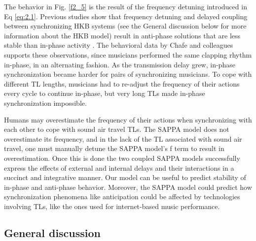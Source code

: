 \documentclass{report}
\begin{document}
The behavior in Fig.{} \ref{f2_5} is the result of the frequency detuning introduced in Eq \eqref{eq:2.1}. Previous studies show that frequency detuning and delayed coupling between synchronizing HKB systems (see the General discussion below for more information about the HKB model) result in anti-phase solutions that are less stable than in-phase activity \cite{slowinski2016effects, avitabile2016beyond}. The behavioral data by Chafe and colleagues \cite{chafe2010effect} supports these observations, since musicians performed the same clapping rhythm in-phase, in an alternating fashion. As the transmission delay grew, in-phase synchronization became harder for pairs of synchronizing musicians. To cope with different TL lengths, musicians had to re-adjust the frequency of their actions every cycle to continue in-phase, but very long TLs made in-phase synchronization impossible.

Humans may overestimate the frequency of their actions when synchronizing with each other to cope with sound air travel TLs. The SAPPA model does not overestimate its frequency, and in the lack of the TL associated with sound air travel, one must manually detune the SAPPA model's f term to result in overestimation. Once this is done the two coupled SAPPA models successfully express the effects of external and internal delays and their interactions in a succinct and integrative manner. Our model can be useful to predict stability of in-phase and anti-phase behavior. Moreover, the SAPPA model could predict how synchronization phenomena like anticipation could be affected by technologies involving TLs, like the ones used for internet-based music performance.

\subsection{General discussion}
\end{document}
